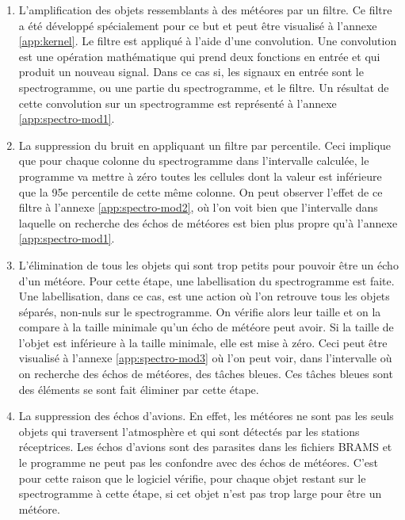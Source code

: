 \documentclass[11pt]{article}
\begin{document}
\begin{enumerate}
    \item L'amplification des objets ressemblants à des météores par un filtre.
          Ce filtre a été développé spécialement pour ce but et peut être visualisé à l'annexe \ref{app:kernel}.
          Le filtre est appliqué à l'aide d'une convolution.
          Une convolution est une opération mathématique qui prend deux fonctions en entrée et qui produit un nouveau signal.
          Dans ce cas si, les signaux en entrée sont le spectrogramme, ou une partie du spectrogramme, et le filtre.
          Un résultat de cette convolution sur un spectrogramme est représenté à l'annexe \ref{app:spectro-mod1}.
    \item La suppression du bruit en appliquant un filtre par percentile.
          Ceci implique que pour chaque colonne du spectrogramme dans l'intervalle calculée, le programme va mettre à zéro toutes les cellules dont la valeur est inférieure que la 95e percentile de cette même colonne.
          On peut observer l'effet de ce filtre à l'annexe \ref{app:spectro-mod2}, où l'on voit bien que l'intervalle dans laquelle on recherche des échos de météores est bien plus propre qu'à l'annexe \ref{app:spectro-mod1}.
    \item L'élimination de tous les objets qui sont trop petits pour pouvoir être un écho d'un météore.
          Pour cette étape, une labellisation du spectrogramme est faite.
          Une labellisation, dans ce cas, est une action où l'on retrouve tous les objets séparés, non-nuls sur le spectrogramme.
          On vérifie alors leur taille et on la compare à la taille minimale qu'un écho de météore peut avoir.
          Si la taille de l'objet est inférieure à la taille minimale, elle est mise à zéro.
          Ceci peut être visualisé à l'annexe \ref{app:spectro-mod3} où l'on peut voir, dans l'intervalle où on recherche des échos de météores, des tâches bleues.
          Ces tâches bleues sont des éléments se sont fait éliminer par cette étape.
    \item La suppression des échos d'avions.
          En effet, les météores ne sont pas les seuls objets qui traversent l'atmosphère et qui sont détectés par les stations réceptrices.
          Les échos d'avions sont des parasites dans les fichiers BRAMS et le programme ne peut pas les confondre avec des échos de météores.
          C'est pour cette raison que le logiciel vérifie, pour chaque objet restant sur le spectrogramme à cette étape, si cet objet n'est pas trop large pour être un météore.
\end{enumerate}
\end{document}
